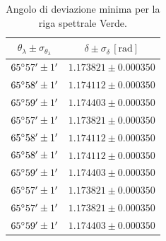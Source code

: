 \documentclass[]{article}
\begin{document}
    \begin{table}[H]
        \centering
        \begin{tabular}{||c|c||}
            \hline
            $\theta_{\lambda} \pm \sigma_{\theta_{\lambda}}$ & $\delta \pm \sigma_{\delta} \,\left[\text{rad}\right]$ \\\hline
            \hline
            $65\degree 57' \pm 1'$ & $1.173821 \pm 0.000350$ \\\hline
            $65\degree 58' \pm 1'$ & $1.174112 \pm 0.000350$ \\\hline
            $65\degree 59' \pm 1'$ & $1.174403 \pm 0.000350$ \\\hline
            $65\degree 57' \pm 1'$ & $1.173821 \pm 0.000350$ \\\hline
            $65\degree 58' \pm 1'$ & $1.174112 \pm 0.000350$ \\\hline
            $65\degree 58' \pm 1'$ & $1.174112 \pm 0.000350$ \\\hline
            $65\degree 59' \pm 1'$ & $1.174403 \pm 0.000350$ \\\hline
            $65\degree 57' \pm 1'$ & $1.173821 \pm 0.000350$ \\\hline
            $65\degree 57' \pm 1'$ & $1.173821 \pm 0.000350$ \\\hline
            $65\degree 59' \pm 1'$ & $1.174403 \pm 0.000350$ \\\hline
        \end{tabular}
        \caption{Angolo di deviazione minima per la riga spettrale Verde.}
        \label{verde}
    \end{table}
\end{document}
